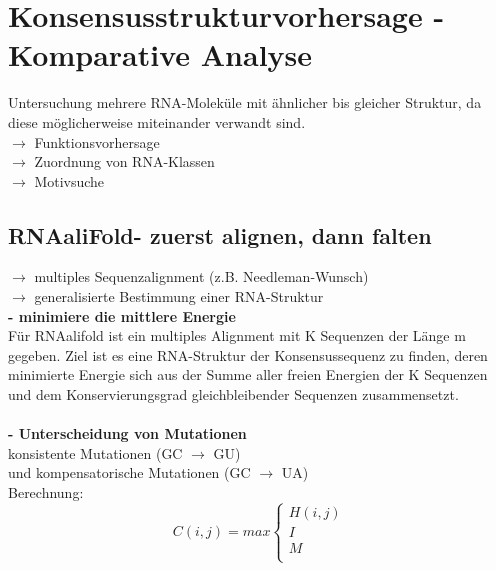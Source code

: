 \section{Konsensusstrukturvorhersage - Komparative Analyse}

Untersuchung mehrere RNA-Moleküle mit ähnlicher bis gleicher Struktur, da diese möglicherweise miteinander verwandt sind. \\
$\rightarrow$ Funktionsvorhersage \\
$\rightarrow$ Zuordnung von RNA-Klassen \\
$\rightarrow$ Motivsuche

\subsection{RNAaliFold- zuerst alignen, dann falten}
$\rightarrow$ multiples Sequenzalignment (z.B. Needleman-Wunsch) \\
$\rightarrow$ generalisierte Bestimmung einer RNA-Struktur \\

\textbf{- minimiere die mittlere Energie} \\
Für RNAalifold ist ein multiples Alignment mit K Sequenzen der Länge m gegeben. Ziel ist es eine RNA-Struktur der Konsensussequenz zu finden, deren minimierte Energie sich aus der Summe aller freien Energien der K Sequenzen und dem Konservierungsgrad gleichbleibender Sequenzen zusammensetzt.\\
\\
\textbf{- Unterscheidung von Mutationen} \\
konsistente Mutationen (GC $\rightarrow$ GU) \\
und kompensatorische Mutationen (GC $\rightarrow$ UA) \\ 

Berechnung:
\begin{equation}
C(i,j)= max
\begin{cases} 
H(i,j)\\ 
I\\ 
M\\
\end{cases}
\end{equation}

